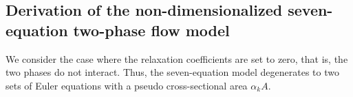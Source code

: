 \documentclass[preprint,10pt]{elsarticle}
\begin{document}
%
%
\subsection{Derivation of the non-dimensionalized seven-equation two-phase flow model}\label{sec:scaled-SEM}
We consider the case where the relaxation coefficients are set to zero, that is,   
the two phases do not interact. Thus, the seven-equation model degenerates to two sets of Euler equations with a pseudo cross-sectional area $\alpha_k A$. 
\end{document}
